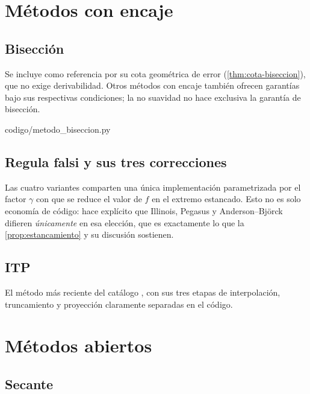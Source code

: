 \section{Métodos con encaje}

\subsection{Bisección}

Se incluye como referencia por su cota geométrica de error
(\cref{thm:cota-biseccion}), que no exige derivabilidad. Otros métodos con
encaje también ofrecen garantías bajo sus respectivas condiciones; la no
suavidad no hace exclusiva la garantía de bisección.

%
{codigo/metodo_biseccion.py}

\subsection{Regula falsi y sus tres correcciones}

Las cuatro variantes comparten una única implementación parametrizada por el
factor $\gamma$ con que se reduce el valor de $f$ en el extremo estancado. Esto no
es solo economía de código: hace explícito que Illinois, Pegasus y
Anderson--Björck difieren \emph{únicamente} en esa elección, que es exactamente lo
que la \cref{prop:estancamiento} y su discusión sostienen.



\subsection{ITP}

El método más reciente del catálogo \citep{oliveira2021}, con sus tres etapas de
interpolación, truncamiento y proyección claramente separadas en el código.



\section{Métodos abiertos}

\subsection{Secante}

